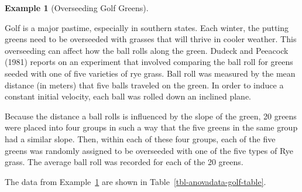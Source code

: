 \documentclass[
  letterpaper,
  DIV=11,
  numbers=noendperiod]{scrreprt}
\theoremstyle{plain}
\theoremstyle{definition}
\newtheorem{example}{Example}[chapter]
\theoremstyle{definition}
\theoremstyle{remark}
\begin{document}
\begin{example}[Overseeding Golf
Greens]\protect\hypertarget{exm-anovadata-golf}{}\label{exm-anovadata-golf}

Golf is a major pastime, especially in southern states. Each winter, the
putting greens need to be overseeded with grasses that will thrive in
cooler weather. This overseeding can affect how the ball rolls along the
green. Dudeck and Peeacock (1981) reports on an experiment that involved
comparing the ball roll for greens seeded with one of five varieties of
rye grass. Ball roll was measured by the mean distance (in meters) that
five balls traveled on the green. In order to induce a constant initial
velocity, each ball was rolled down an inclined plane.

Because the distance a ball rolls is influenced by the slope of the
green, 20 greens were placed into four groups in such a way that the
five greens in the same group had a similar slope. Then, within each of
these four groups, each of the five greens was randomly assigned to be
overseeded with one of the five types of Rye grass. The average ball
roll was recorded for each of the 20 greens.

\end{example}

The data from Example~\ref{exm-anovadata-golf} are shown in
Table~\ref{tbl-anovadata-golf-table}.
\end{document}
